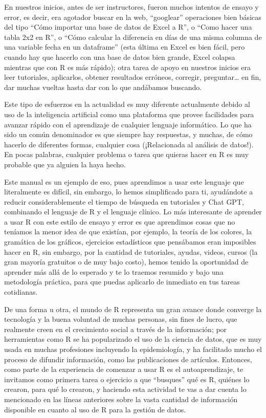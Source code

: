 \documentclass[
  letterpaper,
  DIV=11,
  numbers=noendperiod]{scrreprt}
\begin{document}
En nuestros inicios, antes de ser instructores, fueron muchos intentos
de ensayo y error, es decir, era agotador buscar en la web, ``googlear''
operaciones bien básicas del tipo ``Cómo importar una base de datos de
Excel a R'', o ``Como hacer una tabla 2x2 en R'', o ``Cómo calcular la
diferencia en días de una misma columna de una variable fecha en un
dataframe'' (esta última en Excel es bien fácil, pero cuando hay que
hacerlo con una base de datos bien grande, Excel colapsa mientras que
con R es más rápido); otra tarea de apoyo en nuestros inicios era leer
tutoriales, aplicarlos, obtener resultados erróneos, corregir,
preguntar\ldots{} en fin, dar muchas vueltas hasta dar con lo que
andábamos buscando.

Este tipo de esfuerzos en la actualidad es muy diferente actualmente
debido al uso de la inteligencia artificial como una plataforma que
provee facilidades para avanzar rápido con el aprendizaje de cualquier
lenguaje informático. Lo que ha sido un común denominador es que siempre
hay respuestas, y muchas, de cómo hacerlo de diferentes formas,
cualquier cosa (¡Relacionada al análisis de datos!). En pocas palabras,
cualquier problema o tarea que quieras hacer en R es muy probable que ya
alguien la haya hecho.

Este manual es un ejemplo de eso, pues aprendimos a usar este lenguaje
que literalmente es difícil, sin embargo, lo hemos simplificado para ti,
ayudándote a reducir considerablemente el tiempo de búsqueda en
tutoriales y Chat GPT, combinando el lenguaje de R y el lenguaje
clínico. Lo más interesante de aprender a usar R con este estilo de
ensayo y error es que aprendimos cosas que no teníamos la menor idea de
que existían, por ejemplo, la teoría de los colores, la gramática de los
gráficos, ejercicios estadísticos que pensábamos eran imposibles hacer
en R, sin embargo, por la cantidad de tutoriales, ayudas, videos, cursos
(la gran mayoría gratuitos o de muy bajo costo), hemos tenido la
oportunidad de aprender más allá de lo esperado y te lo traemos resumido
y bajo una metodología práctica, para que puedas aplicarlo de inmediato
en tus tareas cotidianas.

De una forma u otra, el mundo de R representa un gran avance donde
converge la tecnología y la buena voluntad de muchas personas, sin fines
de lucro, que realmente creen en el crecimiento social a través de la
información; por herramientas como R se ha popularizado el uso de la
ciencia de datos, que es muy usada en muchas profesiones incluyendo la
epidemiología, y ha facilitado mucho el proceso de difundir información,
como las publicaciones de artículos. Entonces, como parte de la
experiencia de comenzar a usar R es el autoaprendizaje, te invitamos
como primera tarea o ejercicio a que ``busques'' qué es R, quiénes lo
crearon, para qué lo crearon, y haciendo esta actividad te vas a dar
cuenta lo mencionado en las líneas anteriores sobre la vasta cantidad de
información disponible en cuanto al uso de R para la gestión de datos.
\end{document}
